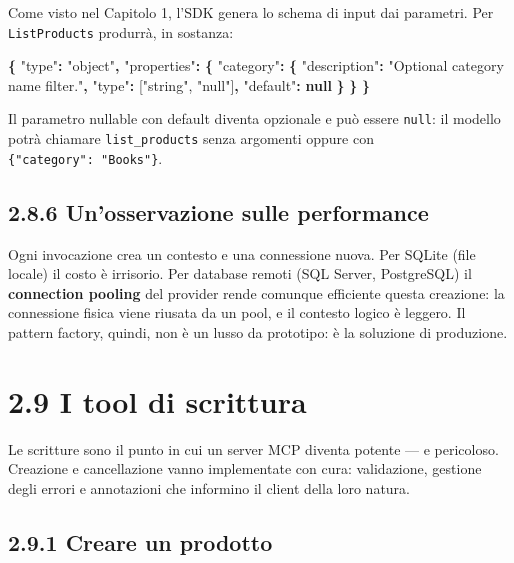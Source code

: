 \documentclass[
  italian,
  10pt,
]{book}
\newenvironment{Shaded}{\begin{snugshade}}{\end{snugshade}}
\newcommand{\DataTypeTok}[1]{\textcolor[rgb]{0.13,0.29,0.53}{#1}}
\newcommand{\FunctionTok}[1]{\textcolor[rgb]{0.13,0.29,0.53}{\textbf{#1}}}
\newcommand{\KeywordTok}[1]{\textcolor[rgb]{0.13,0.29,0.53}{\textbf{#1}}}
\newcommand{\OtherTok}[1]{\textcolor[rgb]{0.56,0.35,0.01}{#1}}
\newcommand{\StringTok}[1]{\textcolor[rgb]{0.31,0.60,0.02}{#1}}
\begin{document}
Come visto nel Capitolo 1, l'SDK genera lo schema di input dai
parametri. Per \texttt{ListProducts} produrrà, in sostanza:

\begin{Shaded}
\begin{Highlighting}[]
\FunctionTok{\{}
  \DataTypeTok{"type"}\FunctionTok{:} \StringTok{"object"}\FunctionTok{,}
  \DataTypeTok{"properties"}\FunctionTok{:} \FunctionTok{\{}
    \DataTypeTok{"category"}\FunctionTok{:} \FunctionTok{\{}
      \DataTypeTok{"description"}\FunctionTok{:} \StringTok{"Optional category name filter."}\FunctionTok{,}
      \DataTypeTok{"type"}\FunctionTok{:} \OtherTok{[}\StringTok{"string"}\OtherTok{,} \StringTok{"null"}\OtherTok{]}\FunctionTok{,}
      \DataTypeTok{"default"}\FunctionTok{:} \KeywordTok{null}
    \FunctionTok{\}}
  \FunctionTok{\}}
\FunctionTok{\}}
\end{Highlighting}
\end{Shaded}

Il parametro nullable con default diventa opzionale e può essere
\texttt{null}: il modello potrà chiamare \texttt{list\_products} senza
argomenti oppure con \texttt{\{"category":\ "Books"\}}.

\subsection{2.8.6 Un'osservazione sulle
performance}\label{unosservazione-sulle-performance}

Ogni invocazione crea un contesto e una connessione nuova. Per SQLite
(file locale) il costo è irrisorio. Per database remoti (SQL Server,
PostgreSQL) il \textbf{connection pooling} del provider rende comunque
efficiente questa creazione: la connessione fisica viene riusata da un
pool, e il contesto logico è leggero. Il pattern factory, quindi, non è
un lusso da prototipo: è la soluzione di produzione.

\section{2.9 I tool di scrittura}\label{i-tool-di-scrittura}

Le scritture sono il punto in cui un server MCP diventa potente --- e
pericoloso. Creazione e cancellazione vanno implementate con cura:
validazione, gestione degli errori e annotazioni che informino il client
della loro natura.

\subsection{2.9.1 Creare un prodotto}\label{creare-un-prodotto}
\end{document}
